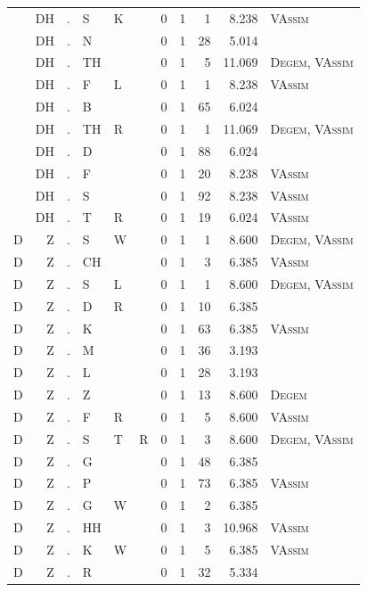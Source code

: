 \documentclass[12pt]{article}
\begin{document}
\begin{longtable}{r@{ } r@{ } c@{ } l@{ } l@{ } l@{ } r r r r l }
 & DH & . & S & K &  & 0 & 1 & 1 & 8.238 & \textsc{VAssim} \\
 & DH & . & N &  &  & 0 & 1 & 28 & 5.014 &  \\
 & DH & . & TH &  &  & 0 & 1 & 5 & 11.069 & \textsc{Degem}, \textsc{VAssim} \\
 & DH & . & F & L &  & 0 & 1 & 1 & 8.238 & \textsc{VAssim} \\
 & DH & . & B &  &  & 0 & 1 & 65 & 6.024 &  \\
 & DH & . & TH & R &  & 0 & 1 & 1 & 11.069 & \textsc{Degem}, \textsc{VAssim} \\
 & DH & . & D &  &  & 0 & 1 & 88 & 6.024 &  \\
 & DH & . & F &  &  & 0 & 1 & 20 & 8.238 & \textsc{VAssim} \\
 & DH & . & S &  &  & 0 & 1 & 92 & 8.238 & \textsc{VAssim} \\
 & DH & . & T & R &  & 0 & 1 & 19 & 6.024 & \textsc{VAssim} \\
D & Z & . & S & W &  & 0 & 1 & 1 & 8.600 & \textsc{Degem}, \textsc{VAssim} \\
D & Z & . & CH &  &  & 0 & 1 & 3 & 6.385 & \textsc{VAssim} \\
D & Z & . & S & L &  & 0 & 1 & 1 & 8.600 & \textsc{Degem}, \textsc{VAssim} \\
D & Z & . & D & R &  & 0 & 1 & 10 & 6.385 &  \\
D & Z & . & K &  &  & 0 & 1 & 63 & 6.385 & \textsc{VAssim} \\
D & Z & . & M &  &  & 0 & 1 & 36 & 3.193 &  \\
D & Z & . & L &  &  & 0 & 1 & 28 & 3.193 &  \\
D & Z & . & Z &  &  & 0 & 1 & 13 & 8.600 & \textsc{Degem} \\
D & Z & . & F & R &  & 0 & 1 & 5 & 8.600 & \textsc{VAssim} \\
D & Z & . & S & T & R & 0 & 1 & 3 & 8.600 & \textsc{Degem}, \textsc{VAssim} \\
D & Z & . & G &  &  & 0 & 1 & 48 & 6.385 &  \\
D & Z & . & P &  &  & 0 & 1 & 73 & 6.385 & \textsc{VAssim} \\
D & Z & . & G & W &  & 0 & 1 & 2 & 6.385 &  \\
D & Z & . & HH &  &  & 0 & 1 & 3 & 10.968 & \textsc{VAssim} \\
D & Z & . & K & W &  & 0 & 1 & 5 & 6.385 & \textsc{VAssim} \\
D & Z & . & R &  &  & 0 & 1 & 32 & 5.334 &  \\

\end{longtable}
\end{document}
